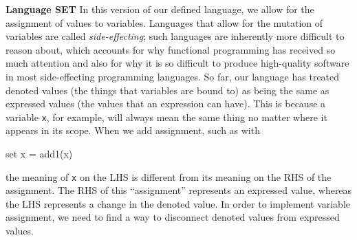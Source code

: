 \begin{minipage}[t]{\sw}
\slidenumber
\LARGE
{\bf Language SET}\exx
In this version of our defined language,
we allow for the assignment of values to variables.
Languages that allow for the mutation of variables
are called {\em side-effecting}; such languages
are inherently more difficult to reason about,
which accounts for why functional programming has received
so much attention and also for why
it is so difficult to produce high-quality software
in most side-effecting programming languages.\exx
So far, our language has treated
denoted values (the things that variables are bound to)
as being the same as expressed values
(the values that an expression can have).
This is because a variable \verb'x', for example,
will always mean the same thing no matter where it appears
in its scope.\exx
When we add assignment, such as with
\begin{qv}
set x = add1(x)
\end{qv}
the meaning of \verb'x' on the LHS is different
from its meaning on the RHS of the assignment.
The RHS of this ``assignment'' represents an expressed value,
whereas the LHS represents a change in the denoted value.
In order to implement variable assignment,
we need to find a way
to disconnect denoted values from expressed values.
\end{minipage}
